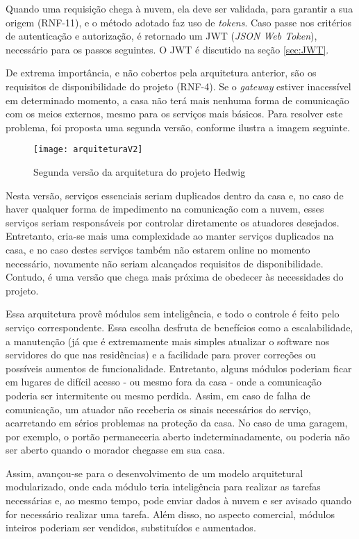 Quando uma requisição chega à nuvem, ela deve ser validada, para garantir a sua origem (RNF-11), e o método adotado faz uso de \emph{tokens}.  Caso passe nos critérios de autenticação e autorização, é retornado um JWT (\textit{JSON Web Token}), necessário para os passos seguintes. O JWT é discutido na seção \ref{sec:JWT}.

De extrema importância, e não cobertos pela arquitetura anterior, são os requisitos de disponibilidade do projeto (RNF-4). Se o \textit{gateway} estiver inacessível em determinado momento, a casa não terá mais nenhuma forma de comunicação com os meios externos, mesmo para os serviços mais básicos. Para resolver este problema, foi proposta uma segunda versão, conforme ilustra a imagem seguinte.

\begin{figure}[H]
	\centering
	\caption{Segunda versão da arquitetura do projeto Hedwig}
  \texttt{[image: arquiteturaV2]}
\label{fig:arquiteturaV2}
\end{figure}

Nesta versão, serviços essenciais seriam duplicados dentro da casa e, no caso de haver qualquer forma de impedimento na comunicação com a nuvem, esses serviços seriam responsáveis por controlar diretamente os atuadores desejados. Entretanto, cria-se mais uma complexidade ao manter serviços duplicados na casa, e no caso destes serviços também não estarem online no momento necessário, novamente não seriam alcançados requisitos de disponibilidade. Contudo, é uma versão que chega mais próxima de obedecer às necessidades do projeto.

Essa arquitetura provê módulos sem inteligência, e todo o controle é feito pelo serviço correspondente. Essa escolha desfruta de benefícios como a escalabilidade, a manutenção (já que é extremamente mais simples atualizar o software nos servidores do que nas residências) e a facilidade para prover correções ou possíveis aumentos de funcionalidade. Entretanto, alguns módulos poderiam ficar em lugares de difícil acesso - ou mesmo fora da casa - onde a comunicação poderia ser intermitente ou mesmo perdida. Assim, em caso de falha de comunicação, um atuador não receberia os sinais necessários do serviço, acarretando em sérios problemas na proteção da casa. No caso de uma garagem, por exemplo, o portão permaneceria aberto indeterminadamente, ou poderia não ser aberto quando o morador chegasse em sua casa.

Assim, avançou-se para o desenvolvimento de um modelo arquitetural modularizado, onde cada módulo teria inteligência para realizar as tarefas necessárias e, ao mesmo tempo, pode enviar dados à nuvem e ser avisado quando for necessário realizar uma tarefa. Além disso, no aspecto comercial, módulos inteiros poderiam ser vendidos, substituídos e aumentados.

